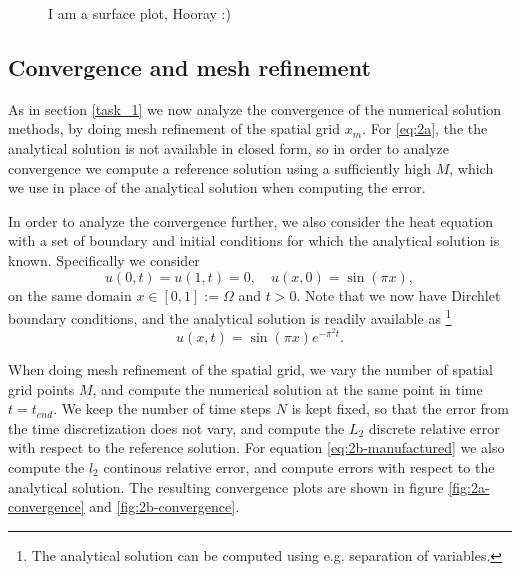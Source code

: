 \begin{figure}[ht]
    \centering
    
    \caption{I am a surface plot, Hooray :)}
    \label{fig:2a-surface}
\end{figure}

\subsection{Convergence and mesh refinement}
As in section \ref{task_1} we now analyze the convergence of the numerical solution methods, 
by doing mesh refinement of the spatial grid $x_m$. 
For \eqref{eq:2a}, the the analytical solution is not available in closed form, 
so in order to analyze convergence we compute a reference solution using a sufficiently high $M$, 
which we use in place of the analytical solution when computing the error. 

In order to analyze the convergence further, 
we also consider the heat equation with a set of boundary and initial conditions for which the analytical solution is known. 
Specifically we consider 
\begin{equation}
    u(0,t) = u(1,t) = 0, \quad u(x,0) = \sin(\pi x), 
    \label{eq:2b-manufactured}
\end{equation}
on the same domain $x \in [0,1] := \Omega$ and $t > 0$. 
Note that we now have Dirchlet boundary conditions, 
and the analytical solution is readily available as 
\footnote{The analytical solution can be computed using e.g. separation of variables.}
\begin{equation}
    u(x,t) = \sin(\pi x)  e^{- \pi^2 t}.
\end{equation}

When doing mesh refinement of the spatial grid, 
we vary the number of spatial grid points $M$, 
and compute the numerical solution at the same point in time $t=t_{end}$. 
We keep the number of time steps $N$ is kept fixed, 
so that the error from the time discretization does not vary, 
and compute the $L_2$ discrete relative error with respect to the reference solution. 
For equation \eqref{eq:2b-manufactured} we also compute the $l_2$ continous relative error, 
and compute errors with respect to the analytical solution. 
The resulting convergence plots are shown in figure \ref{fig:2a-convergence} and \ref{fig:2b-convergence}. 

